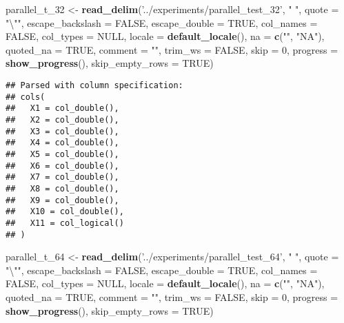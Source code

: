 \documentclass[]{article}
\newenvironment{Shaded}{\begin{snugshade}}{\end{snugshade}}
\newcommand{\KeywordTok}[1]{\textcolor[rgb]{0.13,0.29,0.53}{\textbf{#1}}}
\newcommand{\DataTypeTok}[1]{\textcolor[rgb]{0.13,0.29,0.53}{#1}}
\newcommand{\DecValTok}[1]{\textcolor[rgb]{0.00,0.00,0.81}{#1}}
\newcommand{\CharTok}[1]{\textcolor[rgb]{0.31,0.60,0.02}{#1}}
\newcommand{\StringTok}[1]{\textcolor[rgb]{0.31,0.60,0.02}{#1}}
\newcommand{\OtherTok}[1]{\textcolor[rgb]{0.56,0.35,0.01}{#1}}
\newcommand{\NormalTok}[1]{#1}
\begin{document}
\begin{Shaded}
\begin{Highlighting}[]
\NormalTok{parallel_t_}\DecValTok{32}\NormalTok{ <-}\StringTok{ }\KeywordTok{read_delim}\NormalTok{(}\StringTok{'../experiments/parallel_test_32'}\NormalTok{, }\StringTok{" "}\NormalTok{, }\DataTypeTok{quote =} \StringTok{"}\CharTok{\textbackslash{}"}\StringTok{"}\NormalTok{, }\DataTypeTok{escape_backslash =} \OtherTok{FALSE}\NormalTok{,}
  \DataTypeTok{escape_double =} \OtherTok{TRUE}\NormalTok{, }\DataTypeTok{col_names =} \OtherTok{FALSE}\NormalTok{, }\DataTypeTok{col_types =} \OtherTok{NULL}\NormalTok{,}
  \DataTypeTok{locale =} \KeywordTok{default_locale}\NormalTok{(), }\DataTypeTok{na =} \KeywordTok{c}\NormalTok{(}\StringTok{""}\NormalTok{, }\StringTok{"NA"}\NormalTok{), }\DataTypeTok{quoted_na =} \OtherTok{TRUE}\NormalTok{,}
  \DataTypeTok{comment =} \StringTok{""}\NormalTok{, }\DataTypeTok{trim_ws =} \OtherTok{FALSE}\NormalTok{, }\DataTypeTok{skip =} \DecValTok{0}\NormalTok{, }
 \DataTypeTok{progress =} \KeywordTok{show_progress}\NormalTok{(),}
  \DataTypeTok{skip_empty_rows =} \OtherTok{TRUE}\NormalTok{)}
\end{Highlighting}
\end{Shaded}

\begin{verbatim}
## Parsed with column specification:
## cols(
##   X1 = col_double(),
##   X2 = col_double(),
##   X3 = col_double(),
##   X4 = col_double(),
##   X5 = col_double(),
##   X6 = col_double(),
##   X7 = col_double(),
##   X8 = col_double(),
##   X9 = col_double(),
##   X10 = col_double(),
##   X11 = col_logical()
## )
\end{verbatim}

\begin{Shaded}
\begin{Highlighting}[]
\NormalTok{parallel_t_}\DecValTok{64}\NormalTok{ <-}\StringTok{ }\KeywordTok{read_delim}\NormalTok{(}\StringTok{'../experiments/parallel_test_64'}\NormalTok{, }\StringTok{" "}\NormalTok{, }\DataTypeTok{quote =} \StringTok{"}\CharTok{\textbackslash{}"}\StringTok{"}\NormalTok{, }\DataTypeTok{escape_backslash =} \OtherTok{FALSE}\NormalTok{,}
  \DataTypeTok{escape_double =} \OtherTok{TRUE}\NormalTok{, }\DataTypeTok{col_names =} \OtherTok{FALSE}\NormalTok{, }\DataTypeTok{col_types =} \OtherTok{NULL}\NormalTok{,}
  \DataTypeTok{locale =} \KeywordTok{default_locale}\NormalTok{(), }\DataTypeTok{na =} \KeywordTok{c}\NormalTok{(}\StringTok{""}\NormalTok{, }\StringTok{"NA"}\NormalTok{), }\DataTypeTok{quoted_na =} \OtherTok{TRUE}\NormalTok{,}
  \DataTypeTok{comment =} \StringTok{""}\NormalTok{, }\DataTypeTok{trim_ws =} \OtherTok{FALSE}\NormalTok{, }\DataTypeTok{skip =} \DecValTok{0}\NormalTok{, }
 \DataTypeTok{progress =} \KeywordTok{show_progress}\NormalTok{(),}
  \DataTypeTok{skip_empty_rows =} \OtherTok{TRUE}\NormalTok{)}
\end{Highlighting}
\end{Shaded}
\end{document}
